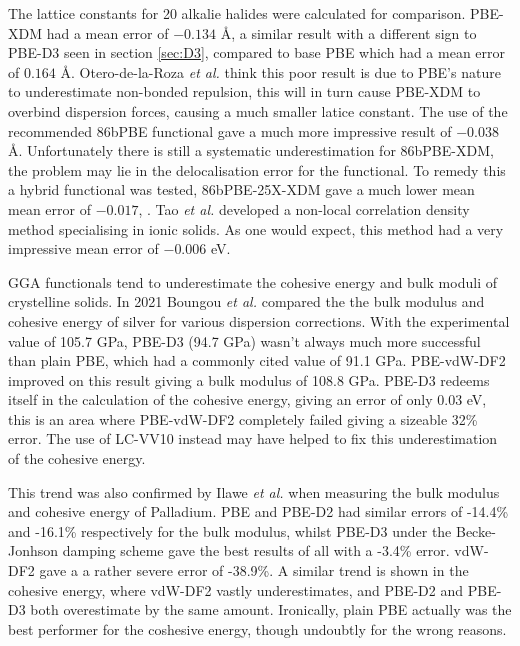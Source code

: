\documentclass[10pt,a4paper,twocolumn,twoside]{extarticle}
\newcommand{\al}{\emph{et al. }}
\newcommand{\oA}{\si{\angstrom}}
\begin{document}
	The lattice constants for 20 alkalie halides were calculated for comparison. PBE-XDM had a mean error of $-0.134$ \oA, a similar result with a different sign to PBE-D3 seen in section \ref{sec:D3}, compared to base PBE which had a mean error of  $0.164$ \oA. Otero-de-la-Roza \al think this poor result is due to PBE's nature to underestimate non-bonded repulsion\cite{PBE-underbinding}, this will in turn cause PBE-XDM to overbind dispersion forces, causing a much smaller latice constant. The use of the recommended 86bPBE functional gave a much more impressive result of $-0.038$ \oA. Unfortunately there is still a systematic underestimation for 86bPBE-XDM, the problem may lie in the delocalisation error for the functional\cite{86bPBE-delocalisation}. To remedy this a hybrid functional was tested, 86bPBE-25X-XDM gave a much lower mean mean error of $-0.017$, \cite{Roza-2020-XDM}. Tao \al developed a non-local correlation density method specialising in ionic solids. As one would expect, this method had a very impressive mean error of $-0.006$ eV.\cite{Tao-vdW}

	GGA functionals tend to underestimate the cohesive energy and bulk moduli of crystelline solids. In 2021 Boungou \al compared the the bulk modulus and cohesive energy of silver for various dispersion corrections.\cite{Boungou2021} With the experimental value of 105.7 GPa, PBE-D3 (94.7 GPa) wasn't always much more successful than plain PBE, which had a commonly cited value of 91.1 GPa. PBE-vdW-DF2 improved on this result giving a bulk modulus of 108.8 GPa. PBE-D3 redeems itself in the calculation of the cohesive energy, giving an error of only 0.03 eV, this is an area where PBE-vdW-DF2 completely failed giving a sizeable 32\% error. The use of LC-VV10 instead may have helped to fix this underestimation of the cohesive energy. 

	This trend was also confirmed by Ilawe \al when measuring the bulk modulus and cohesive energy of Palladium. \cite{Ilawe2015} PBE and PBE-D2 had similar errors of -14.4\% and -16.1\% respectively for the bulk modulus, whilst PBE-D3 under the Becke-Jonhson damping scheme\cite{BJ-Damp} gave the best results of all with a -3.4\% error. vdW-DF2 gave a a rather severe error of -38.9\%. A similar trend is shown in the cohesive energy, where vdW-DF2 vastly underestimates, and PBE-D2 and PBE-D3 both overestimate by the same amount. Ironically, plain PBE actually was the best performer for the coshesive energy, though undoubtly for the wrong reasons. 
\end{document}
